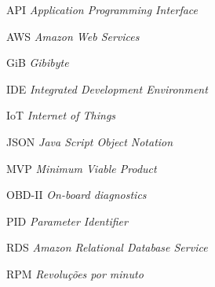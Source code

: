 
\begin{basedescript}{\desclabelstyle{\pushlabel}\desclabelwidth{6em}}
\item[{API}] \textit{Application Programming Interface}
\item[{AWS}] \textit{Amazon Web Services}
\item[{GiB}] \textit{Gibibyte}
\item[{IDE}] \textit{Integrated Development Environment}
\item[{IoT}] \textit{Internet of Things}
\item[{JSON}] \textit{Java Script Object Notation}
\item[{MVP}] \textit{Minimum Viable Product}
\item[{OBD-II}] \textit{On-board diagnostics}
\item[{PID}] \textit{Parameter Identifier}
\item[{RDS}] \textit{Amazon Relational Database Service}
\item[{RPM}] \textit{Revoluções por minuto}



\end{basedescript}